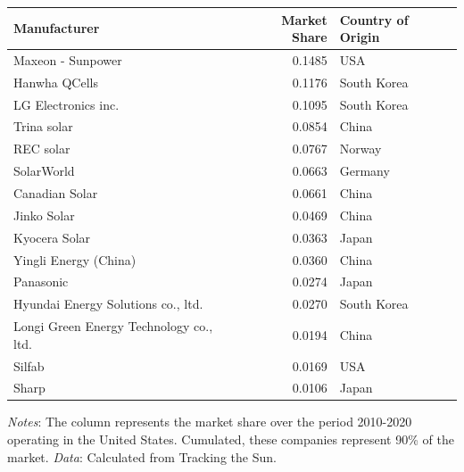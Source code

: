 \begin{table}[!t]
\fontsize{12.0pt}{14.4pt}\selectfont
\begin{tabular*}{\linewidth}{@{\extracolsep{\fill}}lrl}
\toprule
Manufacturer & Market Share & Country of Origin \\ 
\midrule\addlinespace[2.5pt]
Maxeon - Sunpower & 0.1485 & USA \\ 
Hanwha QCells & 0.1176 & South Korea \\ 
LG Electronics inc. & 0.1095 & South Korea \\ 
Trina solar & 0.0854 & China \\ 
REC solar & 0.0767 & Norway \\ 
SolarWorld & 0.0663 & Germany \\ 
Canadian Solar & 0.0661 & China \\ 
Jinko Solar & 0.0469 & China \\ 
Kyocera Solar & 0.0363 & Japan \\ 
Yingli Energy (China) & 0.0360 & China \\ 
Panasonic & 0.0274 & Japan \\ 
Hyundai Energy Solutions co., ltd. & 0.0270 & South Korea \\ 
Longi Green Energy Technology co., ltd. & 0.0194 & China \\ 
Silfab & 0.0169 & USA \\ 
Sharp & 0.0106 & Japan \\ 
\bottomrule
\end{tabular*}

\vspace{5pt}  %
\begin{minipage}{\linewidth}
\footnotesize
\textit{Notes}: The column represents the market share over the period 2010-2020 operating in the United States. Cumulated, these companies represent 90\% of the market. \newline
\textit{Data}: Calculated from Tracking the Sun.
\end{minipage}
\end{table}

